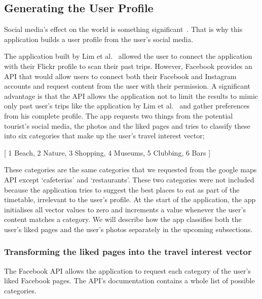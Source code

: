 
\subsection{Generating the User Profile}
Social media's effect on the world is something significant~\cite{Miller2016}.
That is why this application builds a user profile from
the user's social media. 

The application built by Lim et al.~\cite{Lim2018a} allowed the user to connect
the application with their Flickr profile to scan their past trips. However,
Facebook provides an API that would allow users to connect both their Facebook
and Instagram accounts and request content from the user with their permission.
A significant advantage is that the API allows the
application not to limit the results to mimic only
past user's trips like the application by Lim et al.~\cite{Lim2018a} and gather
preferences from his complete profile.
The app requests two things from the
potential tourist's social media, the photos and the liked pages and tries to
classify these into six categories that make up the user's travel interest
vector; 

\begin{center}
    [   
    1 Beach,
    2 Nature,
    3 Shopping,
    4 Museums,
    5 Clubbing,
    6 Bars ]
    
\end{center}



These categories are the same categories that we requested from the google maps
API except `cafeterias' and `restaurants'. These two categories were not
included because the application tries to suggest the best places to eat as
part of the timetable, irrelevant to the user's profile. At the start of the
application, the app initialises all vector values to zero and increments a
value whenever the user's content matches a category. We will describe how the
app classifies both the user's liked pages and the user's photos separately in
the upcoming subsections.

\subsubsection{Transforming the liked pages into the travel interest vector}

The Facebook API allows the application to request each category of the user's
liked Facebook pages. The API's documentation contains a whole list of possible
categories. 

